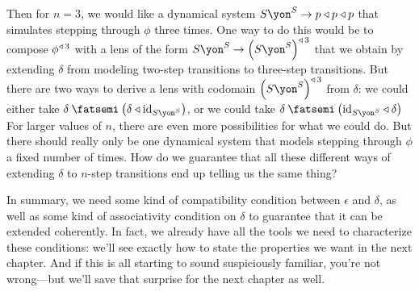 \documentclass[Book-Poly]{subfiles}
\begin{document}
\begin{example}
Then for $n=3$, we would like a dynamical system $S\yon^S\to p\tri p\tri p$ that simulates stepping through $\phi$ three times.
One way to do this would be to compose $\phi^{\mathbin{\triangleleft}\,3}$ with a lens of the form $S\yon^S\to\left(S\yon^S\right)\tripow3$ that we obtain by extending $\delta$ from modeling two-step transitions to three-step transitions.
But there are two ways to derive a lens with codomain $\left(S\yon^S\right)\tripow3$ from $\delta$: we could either take $\delta\then\left(\delta\tri\id_{S\yon^S}\right)$, or we could take $\delta\then\left(\id_{S\yon^S}\tri\delta\right)$
For larger values of $n$, there are even more possibilities for what we could do.
But there should really only be one dynamical system that models stepping through $\phi$ a fixed number of times.
How do we guarantee that all these different ways of extending $\delta$ to $n$-step transitions end up telling us the same thing?

In summary, we need some kind of compatibility condition between $\epsilon$ and $\delta$, as well as some kind of associativity condition on $\delta$ to guarantee that it can be extended coherently.
In fact, we already have all the tools we need to characterize these conditions: we'll see exactly how to state the properties we want in the next chapter.
And if this is all starting to sound suspiciously familiar, you’re not wrong—but we’ll save that surprise for the next chapter as well.
\end{example}
\end{document}
